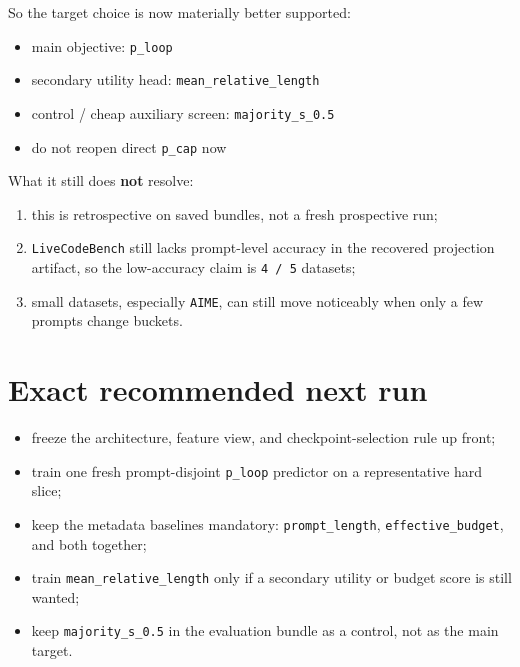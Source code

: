 \documentclass[11pt]{article}
\begin{document}
So the target choice is now materially better supported:
\begin{itemize}[leftmargin=1.5em]
\item main objective: \texttt{p\_loop}
\item secondary utility head: \texttt{mean\_relative\_length}
\item control / cheap auxiliary screen: \texttt{majority\_s\_0.5}
\item do not reopen direct \texttt{p\_cap} now
\end{itemize}

What it still does \textbf{not} resolve:
\begin{enumerate}[leftmargin=1.5em]
\item this is retrospective on saved bundles, not a fresh prospective run;
\item \texttt{LiveCodeBench} still lacks prompt-level accuracy in the recovered
projection artifact, so the low-accuracy claim is \texttt{4 / 5} datasets;
\item small datasets, especially \texttt{AIME}, can still move noticeably when
only a few prompts change buckets.
\end{enumerate}

\section*{Exact recommended next run}
\begin{itemize}[leftmargin=1.5em]
\item freeze the architecture, feature view, and checkpoint-selection rule up
front;
\item train one fresh prompt-disjoint \texttt{p\_loop} predictor on a
representative hard slice;
\item keep the metadata baselines mandatory:
  \texttt{prompt\_length}, \texttt{effective\_budget}, and both together;
\item train \texttt{mean\_relative\_length} only if a secondary utility or
budget score is still wanted;
\item keep \texttt{majority\_s\_0.5} in the evaluation bundle as a control, not
as the main target.
\end{itemize}
\end{document}
